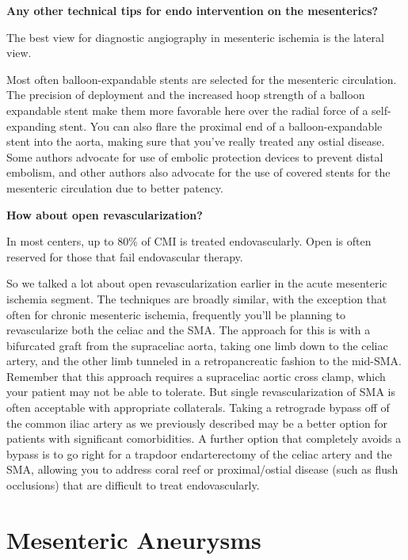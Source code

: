 \documentclass[
]{book}
\begin{document}
\textbf{Any other technical tips for endo intervention on the mesenterics?}

The best view for diagnostic angiography in mesenteric ischemia is the
lateral view.

Most often balloon-expandable stents are selected for the mesenteric
circulation. The precision of deployment and the increased hoop strength
of a balloon expandable stent make them more favorable here over the
radial force of a self-expanding stent. You can also flare the proximal
end of a balloon-expandable stent into the aorta, making sure that
you've really treated any ostial disease. Some authors advocate for use
of embolic protection devices to prevent distal embolism, and other
authors also advocate for the use of covered stents for the mesenteric
circulation due to better patency.\citep{oderichComparisonCoveredStents2013, oderich132ChronicMesenteric2019}

\textbf{How about open revascularization?}

In most centers, up to 80\% of CMI is treated endovascularly. Open is
often reserved for those that fail endovascular
therapy.\citep{oderichOpenSurgicalTreatment2010, oderich132ChronicMesenteric2019}

So we talked a lot about open revascularization earlier in the acute
mesenteric ischemia segment. The techniques are broadly similar, with
the exception that often for chronic mesenteric ischemia, frequently
you'll be planning to revascularize both the celiac and the SMA. The
approach for this is with a bifurcated graft from the supraceliac aorta,
taking one limb down to the celiac artery, and the other limb tunneled
in a retropancreatic fashion to the mid-SMA. Remember that this approach
requires a supraceliac aortic cross clamp, which your patient may not be
able to tolerate. But single revascularization of SMA is often
acceptable with appropriate collaterals. Taking a retrograde bypass off
of the common iliac artery as we previously described may be a better
option for patients with significant comorbidities. A further option
that completely avoids a bypass is to go right for a trapdoor
endarterectomy of the celiac artery and the SMA, allowing you to address
coral reef or proximal/ostial disease (such as flush occlusions) that
are difficult to treat endovascularly.~

\hypertarget{mesenteric-aneurysms}{%
\section{Mesenteric Aneurysms}\label{mesenteric-aneurysms}}
\end{document}
